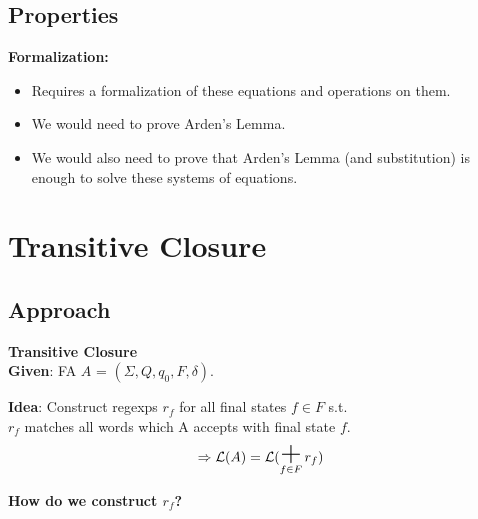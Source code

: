 \documentclass{beamer}
\DeclareMathOperator*{\bigplus}{\mbox{\huge +}}
\begin{document}
\subsection*{Properties}
\begin{frame}
    \textbf{Formalization:} \\
    \begin{itemize}
        \item
            Requires a formalization of these equations and operations on them. 
        \item
            We would need to prove Arden's Lemma.
        \item
            We would also need to prove that Arden's Lemma (and substitution) is enough to solve these systems of equations.
    \end{itemize} 
\end{frame}

\section{Transitive Closure}
\subsection*{Approach}
\begin{frame}

    \large{\textbf{Transitive Closure}} \\

    \textbf{Given}: FA $A$ = $(\Sigma, Q, q_0, F, \delta)$.

    \textbf{Idea}: Construct regexps $r_f$ for all final states $f \in F$ s.t. \\$r_f$ matches all words which A accepts with final state $f$. \\

    \[
        \, \Rightarrow \mathcal{L}(A) = \mathcal{L}(\bigplus\limits_{f \in F} r_f)
    \]

    \vspace{5 mm}

    \textbf{How do we construct $r_f$?} 

\end{frame}
\end{document}
